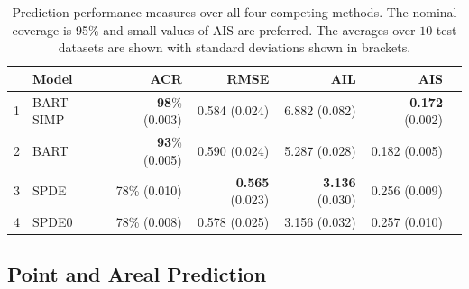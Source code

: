\documentclass[preprint,12pt,authoryear]{elsarticle}
\begin{document}
{
\begin{table}[ht]
\centering
\caption{Prediction performance measures over all four competing methods. The nominal coverage is 95\% and small values of AIS are preferred. The averages over $10$ test datasets are shown with standard deviations shown in brackets.\\}
\begin{tabular}{rlrrrrr}
  \hline
 & Model & ACR & RMSE & AIL & AIS \\ 
  \hline
1 & BART-SIMP & \textbf{98}\% (0.003) & 0.584 (0.024) & 6.882 (0.082) & \textbf{0.172} (0.002) \\
  2 & BART & \textbf{93}\% (0.005) & 0.590 (0.024) & 5.287 (0.028) & 0.182 (0.005)  \\ 
  3 & SPDE & 78\% (0.010) & \textbf{0.565} (0.023) & \textbf{3.136} (0.030) & 0.256 (0.009)\\ 
  4 & SPDE0 & 78\% (0.008) & 0.578 (0.025) & 3.156 (0.032) & 0.257 (0.010) \\ 
   \hline
\end{tabular}
\label{fig:methcomp}
\end{table}
\subsection{Point and Areal Prediction}

}
\end{document}

